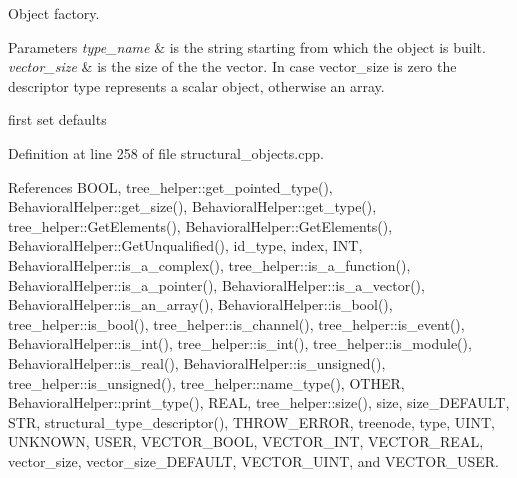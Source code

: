 Object factory. 


\begin{DoxyParams}{Parameters}
{\em type\+\_\+name} & is the string starting from which the object is built. \\
\hline
{\em vector\+\_\+size} & is the size of the the vector. In case vector\+\_\+size is zero the descriptor type represents a scalar object, otherwise an array. \\
\hline
\end{DoxyParams}
first set defaults 

Definition at line 258 of file structural\+\_\+objects.\+cpp.



References B\+O\+OL, tree\+\_\+helper\+::get\+\_\+pointed\+\_\+type(), Behavioral\+Helper\+::get\+\_\+size(), Behavioral\+Helper\+::get\+\_\+type(), tree\+\_\+helper\+::\+Get\+Elements(), Behavioral\+Helper\+::\+Get\+Elements(), Behavioral\+Helper\+::\+Get\+Unqualified(), id\+\_\+type, index, I\+NT, Behavioral\+Helper\+::is\+\_\+a\+\_\+complex(), tree\+\_\+helper\+::is\+\_\+a\+\_\+function(), Behavioral\+Helper\+::is\+\_\+a\+\_\+pointer(), Behavioral\+Helper\+::is\+\_\+a\+\_\+vector(), Behavioral\+Helper\+::is\+\_\+an\+\_\+array(), Behavioral\+Helper\+::is\+\_\+bool(), tree\+\_\+helper\+::is\+\_\+bool(), tree\+\_\+helper\+::is\+\_\+channel(), tree\+\_\+helper\+::is\+\_\+event(), Behavioral\+Helper\+::is\+\_\+int(), tree\+\_\+helper\+::is\+\_\+int(), tree\+\_\+helper\+::is\+\_\+module(), Behavioral\+Helper\+::is\+\_\+real(), Behavioral\+Helper\+::is\+\_\+unsigned(), tree\+\_\+helper\+::is\+\_\+unsigned(), tree\+\_\+helper\+::name\+\_\+type(), O\+T\+H\+ER, Behavioral\+Helper\+::print\+\_\+type(), R\+E\+AL, tree\+\_\+helper\+::size(), size, size\+\_\+\+D\+E\+F\+A\+U\+LT, S\+TR, structural\+\_\+type\+\_\+descriptor(), T\+H\+R\+O\+W\+\_\+\+E\+R\+R\+OR, treenode, type, U\+I\+NT, U\+N\+K\+N\+O\+WN, U\+S\+ER, V\+E\+C\+T\+O\+R\+\_\+\+B\+O\+OL, V\+E\+C\+T\+O\+R\+\_\+\+I\+NT, V\+E\+C\+T\+O\+R\+\_\+\+R\+E\+AL, vector\+\_\+size, vector\+\_\+size\+\_\+\+D\+E\+F\+A\+U\+LT, V\+E\+C\+T\+O\+R\+\_\+\+U\+I\+NT, and V\+E\+C\+T\+O\+R\+\_\+\+U\+S\+ER.

